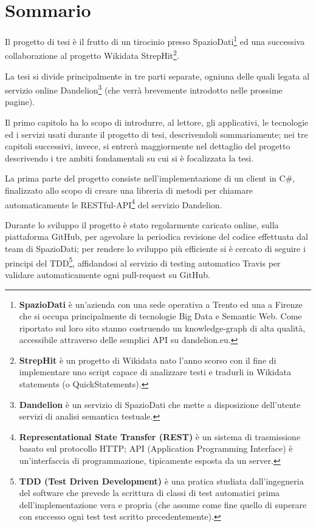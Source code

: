 \chapter*{Sommario} %
\label{sommario}

Il progetto di tesi è il frutto di un tirocinio presso SpazioDati\footnote{
    \textbf{SpazioDati} è un'azienda con una sede operativa a Trento ed una a Firenze che si occupa principalmente di tecnologie Big Data e Semantic Web.
    Come riportato sul loro sito\cite{spaziodati} stanno costruendo un knowledge-graph di alta qualità, accessibile attraverso delle semplici API 
    su dandelion.eu\cite{dandelion}.
}
ed una successiva collaborazione al progetto Wikidata StrepHit\footnote{
    \textbf{StrepHit} è un progetto di Wikidata\cite{wikidata} nato l'anno scorso con il fine di implementare uno script\cite{strephit} 
    capace di analizzare testi e tradurli in Wikidata statements (o QuickStatements\cite{quickstatements}). 
}. 

La tesi si divide principalmente in tre parti separate, ogniuna delle quali legata al servizio online Dandelion\footnote{
    \textbf{Dandelion} è un servizio di SpazioDati che mette a disposizione dell'utente servizi di analisi semantica testuale.
} (che verrà brevemente introdotto nelle prossime pagine). 

Il primo capitolo ha lo scopo di introdurre, al lettore, gli applicativi, le tecnologie ed i servizi usati durante il progetto di tesi, descrivendoli sommariamente; 
nei tre capitoli successivi, invece, si entrerà maggiormente nel dettaglio del progetto descrivendo i tre ambiti fondamentali su cui si è focalizzata la tesi.

La prima parte del progetto consiste nell'implementazione di un client in C$\#$, finalizzato allo scopo di creare una libreria di metodi  
per chiamare automaticamente le RESTful-API\footnote{
    \textbf{Representational State Transfer (REST)}\cite{rest} è un sistema di trasmissione basato sul protocollo HTTP; API (Application Programming Interface\cite{api}) è
    un'interfaccia di programmazione, tipicamente esposta da un server.
} del servizio Dandelion. 

Durante lo sviluppo il progetto è stato regolarmente caricato online, sulla piattaforma GitHub\cite{github}, per agevolare la periodica revisione del codice effettuata dal team di SpazioDati; 
per rendere lo sviluppo più efficiente si è cercato di seguire i principi del TDD\footnote{
        \textbf{TDD (Test Driven Development)}\cite{tdd} è una pratica studiata dall'ingegneria del software che prevede la 
        scrittura di classi di test automatici prima dell'implementazione vera e propria (che assume come fine 
        quello di superare con successo ogni test test scritto precedentemente).    
}, affidandosi al servizio di testing automatico Travis\cite{travis} per validare automaticamente ogni pull-request su GitHub. 

